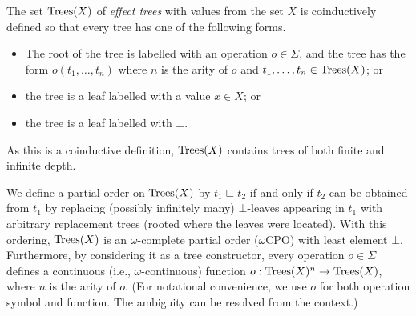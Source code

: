 \documentclass[a4paper,UKenglish]{lipics-v2018}
\newcommand{\Trees}{\textnormal{Trees}}
\newcommand{\Treeleq}{\sqsubseteq}
\theoremstyle{plain}
\begin{document}
\begin{definition}
The set $\Trees(X)$ of \emph{effect trees} with values from  the set $X$ is coinductively defined so that
every tree has one of the following  forms.
\begin{itemize}
\item The root of the tree is labelled with an operation $o \in \Sigma$, and the tree has the form
         $o(t_1, \dots, t_n)$ where $n$ is the arity of $o$ and $t_1, \dots, t_n \in \Trees(X)$; or
\item the tree is a leaf labelled with a value $x \in X$; or
\item the tree is a leaf labelled with $\bot$.
\end{itemize}
\end{definition}
As this is a coinductive definition, $\Trees(X)$ contains trees of both finite and infinite depth.

We define a partial order on  $\Trees(X)$ by
$t_1 \Treeleq t_2$ if and only if $t_2$ can be obtained from $t_1$ by replacing (possibly infinitely many)
$\bot$-leaves appearing in $t_1$ with arbitrary replacement trees (rooted where the leaves were located). With this ordering,  $\Trees(X)$  is an $\omega$-complete 
partial order ($\omega$CPO) with least element $\bot$. Furthermore, by considering it as
a tree constructor,
every operation $o \in \Sigma$  defines a continuous (i.e., $\omega$-continuous) function $o : \Trees(X)^n \to \Trees(X)$, where $n$ is the arity of $o$.
(For notational convenience, we use $o$ for both operation symbol and function. The ambiguity can be resolved from the context.) 
\end{document}
